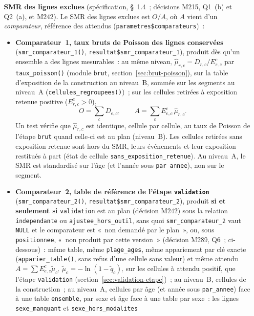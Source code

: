 \documentclass[a4paper,11pt]{article}
\newcommand{\code}[1]{\texttt{\small #1}}
\begin{document}
{\medskip
\textbf{SMR des lignes exclues} (spécification, §~1.4~; décisions M215, Q1~(b)
et Q2~(a), et M242). Le SMR des lignes exclues est $O/A$, où $A$ vient d'un
\emph{comparateur}, référence des attendus
(\code{parametres\$comparateurs})~:
\begin{itemize}[leftmargin=*, itemsep=2pt]
  \item \textbf{Comparateur~1, taux bruts de Poisson des lignes conservées}
    (\code{smr\_comparateur\_1()}, \code{resultat\$smr\_comparateur\_1}),
    produit dès qu'un ensemble a des lignes mesurables~: au même niveau,
    $\hat\mu_{r,c} = D_{r,c} / E^c_{r,c}$ par \code{taux\_poisson()} (module
    \code{brut}, section~\ref{sec:brut-poisson}), sur la table d'exposition
    de la construction au niveau~B, sommée sur les segments au niveau~A
    (\code{cellules\_regroupees()})~; sur les cellules retirées à exposition
    retenue positive ($E^c_{r,c} > 0$),
    \[
      O = \sum_c D_{e,c}, \qquad A = \sum_c E^c_{e,c}\,\hat\mu_{r,c}.
    \]
    Un test vérifie que $\hat\mu_{r,c}$ est identique, cellule par cellule,
    au taux de Poisson de l'étape \code{brut} quand celle-ci est au plan
    (niveau~B). Les
    cellules retirées sans exposition retenue sont hors du SMR, leurs
    événements et leur exposition restitués à part (état de cellule
    \code{sans\_exposition\_retenue}). Au niveau~A, le SMR est standardisé
    sur l'âge (et l'année sous \code{par\_annee}), non sur le segment.
  \item \textbf{Comparateur~2, table de référence de l'étape
    \code{validation}} (\code{smr\_comparateur\_2()},
    \code{resultat\$smr\_comparateur\_2}), produit \textbf{si et seulement
    si} \code{validation} est au plan (décision M242) sous la relation
    \code{independante} ou \code{ajustee\_hors\_outil}, sans quoi
    \code{smr\_comparateur\_2} vaut \code{NULL} et le comparateur est
    «~non demandé par le plan~», ou, sous \code{positionnee}, «~non produit
    par cette version~» (décision M289, Q6~; ci-dessous)~:
    même table, même \code{plage\_ages}, même appariement par clé exacte
    (\code{apparier\_table()}, sans refus d'une cellule sans valeur) et même
    attendu $A = \sum E^c_{e,c}\tilde\mu_c$, $\tilde\mu_c = -\ln(1 - \tilde
    q_c)$, sur les cellules à attendu positif, que l'étape \code{validation}
    (section~\ref{sec:validation-etape})~; au niveau~B, cellules de la
    construction~; au niveau~A, cellules par âge (et année sous
    \code{par\_annee}) face à une table \code{ensemble}, par sexe et âge
    face à une table par sexe~: les lignes \code{sexe\_manquant} et \code{sexe\_hors\_modalites}

\end{itemize}}
\end{document}
